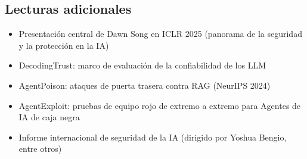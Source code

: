 \documentclass[a4paper]{article}
\begin{document}
\subsection{Lecturas adicionales}
\begin{itemize}
    \item Presentación central de Dawn Song en ICLR 2025 (panorama de la seguridad y la protección en la IA)
    \item DecodingTrust: marco de evaluación de la confiabilidad de los LLM
    \item AgentPoison: ataques de puerta trasera contra RAG (NeurIPS 2024)
    \item AgentExploit: pruebas de equipo rojo de extremo a extremo para Agentes de IA de caja negra
    \item Informe internacional de seguridad de la IA (dirigido por Yoshua Bengio, entre otros)
\end{itemize}

\end{document}
